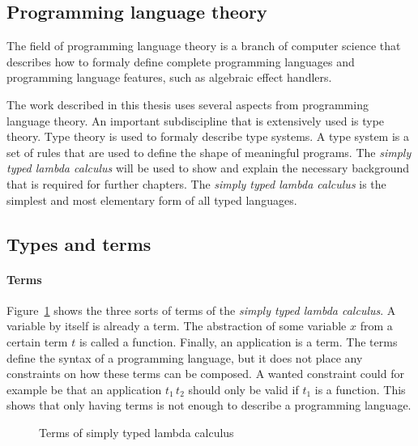 \subsection{Programming language theory}
The field of programming language theory is a branch of computer science that describes how to formaly define complete programming languages and programming language features, such as algebraic effect handlers.

The work described in this thesis uses several aspects from programming language theory. An important subdiscipline that is extensively used is type theory. Type theory is used to formaly describe type systems. A type system is a set of rules that are used to define the shape of meaningful programs. The \textit{simply typed lambda calculus} will be used to show and explain the necessary background that is required for further chapters. The \textit{simply typed lambda calculus} is the simplest and most elementary form of all typed languages. \cite{pierce2002types}

\subsection{Types and terms}

\paragraph{Terms}
Figure~\ref{fig:terms:lambda} shows the three sorts of terms of the \textit{simply typed lambda calculus}. A variable by itself is already a term. The abstraction of some variable $x$ from a certain term $t$ is called a function. Finally, an application is a term. The terms define the syntax of a programming language, but it does not place any constraints on how these terms can be composed. A wanted constraint could for example be that an application $t_1 \, t_2$ should only be valid if $t_1$ is a function. This shows that only having terms is not enough to describe a programming language. \cite{hindley1986introduction}

\begin{figure}[!htb]
\begin{center}
\end{center}
\caption{Terms of simply typed lambda calculus}\label{fig:terms:lambda}
\end{figure}


